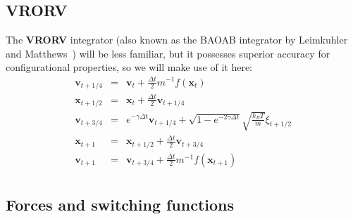 \documentclass[aip,jcp,preprint,superscriptaddress,floatfix]{revtex4-1}
\newcommand{\x}{\mathbf{x}}
\newcommand{\vel}{\mathbf{v}}
\newcommand{\splitting}[1]{{\bf \sf #1}} %
\begin{document}
\subsection{\splitting{VRORV}}
The \splitting{VRORV} integrator (also known as the BAOAB integrator by Leimkuhler and Matthews~\cite{gBAOAB,BAOAB}) will be less familiar, but it possesses superior accuracy for configurational properties, so we will make use of it here:
\begin{eqnarray}
\vel_{t+1/4} &=& \vel_{t} +  \frac{\Delta t}{2} m^{-1} f(\x_t) \nonumber \\
\x_{t+1/2} &=& \x_t + \frac{\Delta t}{2} \vel_{t+1/4} \nonumber \\
\vel_{t+3/4} &=& e^{-\gamma \Delta t} \vel_{t+1/4} + \sqrt{1 - e^{-2 \gamma \Delta t}} \sqrt{\frac{k_B T}{m}} \xi_{t+1/2} \nonumber \\
\x_{t+1} &=& \x_{t+1/2} + \frac{\Delta t}{2} \vel_{t+3/4} \nonumber \\
\vel_{t+1} &=& \vel_{t+3/4} +  \frac{\Delta t}{2} m^{-1} f(\x_{t+1}) \nonumber \\
\end{eqnarray}

\subsection{Forces and switching functions}
\end{document}
